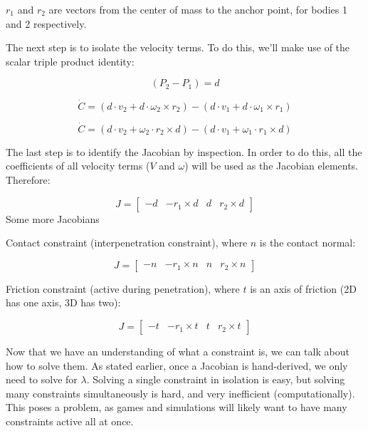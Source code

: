 \(r_1\) and \(r_2\) are vectors from the center of mass to the anchor point, for bodies 1 and 2 respectively.

The next step is to isolate the velocity terms. To do this, we'll make use of the scalar triple product identity:

\begin{equation}
(P_2 - P_1) = d
\label{eq11}
\end{equation}

\begin{equation}
\dot{C} = (d \cdot v_2 + d \cdot \omega_2 \times r_2) - (d \cdot v_1 + d \cdot \omega_1 \times r_1)
\label{eq12}
\end{equation}

\begin{equation}
\dot{C} = (d \cdot v_2 + \omega_2 \cdot r_2 \times d) - (d \cdot v_1 + \omega_1 \cdot r_1 \times d)
\label{eq13}
\end{equation}

The last step is to identify the Jacobian by inspection. In order to do this, all the coefficients of all velocity terms (\(V\) and \(\omega\)) will be used as the Jacobian elements. Therefore:

\begin{equation}
J = \begin{bmatrix} -d & -r_1 \times d & d & r_2 \times d \end{bmatrix}
\label{eq14}
\end{equation}
Some more Jacobians

Contact constraint (interpenetration constraint), where \(n\) is the contact normal:

\begin{equation}
J = \begin{bmatrix} -n & -r_1 \times n & n & r_2 \times n \end{bmatrix}
\label{eq15}
\end{equation}

Friction constraint (active during penetration), where \(t\) is an axis of friction (2D has one axis, 3D has two):

\begin{equation}
J = \begin{bmatrix} -t & -r_1 \times t & t & r_2 \times t \end{bmatrix}
\label{eq16}
\end{equation}

Now that we have an understanding of what a constraint is, we can talk about how to solve them. As stated earlier, once a Jacobian is hand-derived, we only need to solve for \(\lambda\). Solving a single constraint in isolation is easy, but solving many constraints simultaneously is hard, and very inefficient (computationally). This poses a problem, as games and simulations will likely want to have many constraints active all at once.

